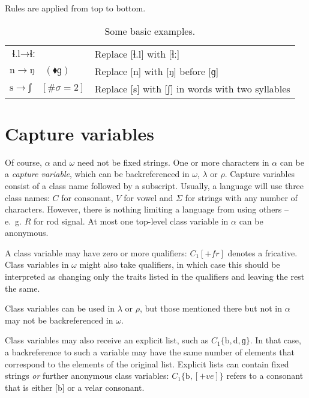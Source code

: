 \documentclass{book}
\begin{document}
Rules are applied from top to bottom.

\begin{table}[h]
  \caption{Some basic examples.}
  \centering
  \begin{tabu} to \linewidth {|l|X|}
    \hline
    $\text{ɬ.l} \rightarrow \text{ɬː}$ & Replace [ɬ.l] with [ɬː] \\
    $\text{n} \rightarrow \text{ŋ} \quad(\blacklozenge \text{ɡ})$ & Replace [n] with [ŋ] before [ɡ] \\
    $\text{s} \rightarrow \text{ʃ} \quad[\#\sigma = 2]$ & Replace [s] with [ʃ] in words with two syllables \\
    \hline
  \end{tabu}
\end{table}

\section{Capture variables}

Of course, $\alpha$ and $\omega$ need not be fixed strings. One or more characters in $\alpha$ can be a \emph{capture variable}, which can be backreferenced in $\omega$, $\lambda$ or $\rho$. Capture variables consist of a class name followed by a subscript. Usually, a language will use three class names: $C$ for consonant, $V$ for vowel and $\Sigma$ for strings with any number of characters. However, there is nothing limiting a language from using others -- e.~g. $R$ for rod signal. At most one top-level class variable in $\alpha$ can be anonymous.

A class variable may have zero or more qualifiers: $C_1[+fr]$ denotes a fricative. Class variables in $\omega$ might also take qualifiers, in which case this should be interpreted as changing only the traits listed in the qualifiers and leaving the rest the same.

Class variables can be used in $\lambda$ or $\rho$, but those mentioned there but not in $\alpha$ may not be backreferenced in $\omega$.

Class variables may also receive an explicit list, such as $C_1\{\text{b}, \text{d}, \text{ɡ}\}$. In that case, a backreference to such a variable may have the same number of elements that correspond to the elements of the original list. Explicit lists can contain fixed strings \emph{or} further anonymous class variables: $C_1\{\text{b}, [+ve]\}$ refers to a consonant that is either [b] or a velar consonant.
\end{document}
